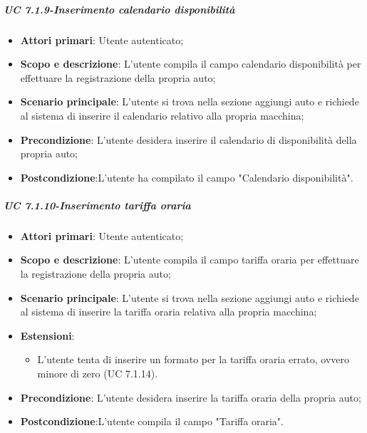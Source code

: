         \subparagraph{UC 7.1.9-Inserimento calendario disponibilità}
    \begin{itemize}
                \item \textbf{Attori primari}: Utente autenticato;
              
                 \item \textbf{Scopo e descrizione}: L'utente compila il campo calendario disponibilità per effettuare la registrazione della propria auto;
                 \item \textbf{Scenario principale}: L'utente si trova nella sezione aggiungi auto e richiede al sistema di inserire il calendario relativo alla propria macchina;
                 
                 \item \textbf{Precondizione}: L'utente desidera inserire il calendario di disponibilità della propria auto;
                 \item \textbf{Postcondizione}:L’utente ha compilato il campo "Calendario disponibilità".
                 \end{itemize}
                 
                 
            \subparagraph{UC 7.1.10-Inserimento tariffa oraria}
    \begin{itemize}
                \item \textbf{Attori primari}: Utente autenticato;
               
                 \item \textbf{Scopo e descrizione}: L'utente compila il campo tariffa oraria per effettuare la registrazione della propria auto;
                 \item \textbf{Scenario principale}: L'utente si trova nella sezione aggiungi auto e richiede al sistema di inserire la tariffa oraria relativa alla propria macchina;
                 \item \textbf{Estensioni}:
                    \begin{itemize}
                        \item L'utente tenta di inserire un formato per la tariffa oraria errato, ovvero minore di zero (UC 7.1.14).
                    \end{itemize}
                 \item \textbf{Precondizione}: L'utente desidera inserire la tariffa oraria della propria auto;
                 \item \textbf{Postcondizione}:L’utente compila il campo "Tariffa oraria".
                 \end{itemize}
                 
